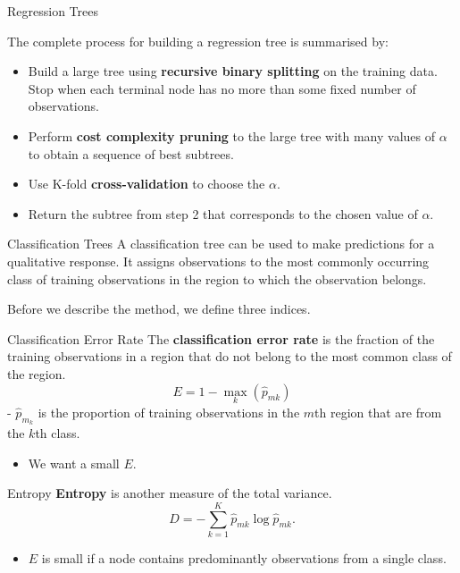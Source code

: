 \documentclass[
  ignorenonframetext,
  aspectratio=169,
]{beamer}
\providecommand{\tightlist}{%
  \setlength{\itemsep}{0pt}\setlength{\parskip}{0pt}}\usepackage{longtable,booktabs,array}
\begin{document}
\begin{frame}{Regression Trees}
\protect\hypertarget{regression-trees-2}{}
\begin{block}{The complete process for building a regression tree is
summarised by:}
\protect\hypertarget{the-complete-process-for-building-a-regression-tree-is-summarised-by}{}
\begin{itemize}
\item
  Build a large tree using \textbf{recursive binary splitting} on the
  training data. Stop when each terminal node has no more than some
  fixed number of observations.
\item
  Perform \textbf{cost complexity pruning} to the large tree with many
  values of \(\alpha\) to obtain a sequence of best subtrees.
\item
  Use K-fold \textbf{cross-validation} to choose the \(\alpha\).
\item
  Return the subtree from step 2 that corresponds to the chosen value of
  \(\alpha\).
\end{itemize}
\end{block}
\end{frame}

\begin{frame}{Classification Trees}
\protect\hypertarget{classification-trees}{}
A classification tree can be used to make predictions for a qualitative
response. It assigns observations to the
\alert{most commonly occurring class} of training observations in the
region to which the observation belongs.

Before we describe the method, we define three indices.
\end{frame}

\begin{frame}{Classification Error Rate}
\protect\hypertarget{classification-error-rate}{}
The \textbf{classification error rate} is the fraction of the training
observations in a region that do not belong to the most common class of
the region. \[
E=1-\max _{k}\left(\hat{p}_{m k}\right)
\] - \(\hat{p}_{m_k}\) is the proportion of training observations in the
\(m\)th region that are from the \(k\)th class.

\begin{itemize}
\tightlist
\item
  We want a small \(E\).
\end{itemize}
\end{frame}

\begin{frame}{Entropy}
\protect\hypertarget{entropy}{}
\textbf{Entropy} is another measure of the total variance.
\[D=-\sum_{k=1}^{K} \hat{p}_{m k} \log \hat{p}_{m k} .\]

\begin{itemize}
\tightlist
\item
  \(E\) is small if a node contains predominantly observations from a
  single class.
\end{itemize}
\end{frame}
\end{document}
